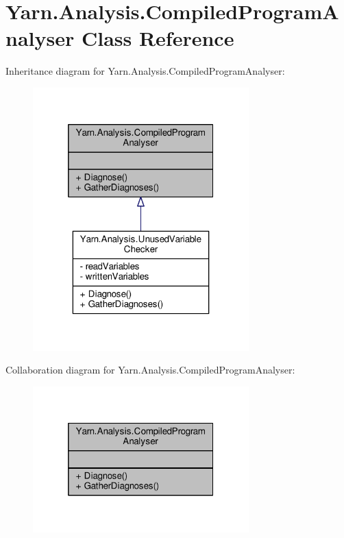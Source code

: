 \hypertarget{a00042}{\section{Yarn.\-Analysis.\-Compiled\-Program\-Analyser Class Reference}
\label{a00042}
}


Inheritance diagram for Yarn.\-Analysis.\-Compiled\-Program\-Analyser\-:
\nopagebreak
\begin{figure}[H]
\begin{center}
\leavevmode
\includegraphics[width=236pt]{a00342}
\end{center}
\end{figure}


Collaboration diagram for Yarn.\-Analysis.\-Compiled\-Program\-Analyser\-:
\nopagebreak
\begin{figure}[H]
\begin{center}
\leavevmode
\includegraphics[width=236pt]{a00343}
\end{center}
\end{figure}
